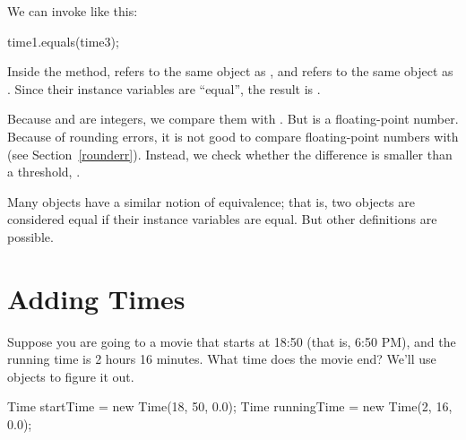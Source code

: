 We can invoke  like this:

\begin{code}
time1.equals(time3);
\end{code}

Inside the  method,  refers to the same object as , and  refers to the same object as .
Since their instance variables are ``equal'', the result is .

Because  and  are integers, we compare them with \java{==}.
But  is a floating-point number.
Because of rounding errors, it is not good to compare floating-point numbers with \java{==} (see Section~\ref{rounderr}).
Instead, we check whether the difference is smaller than a threshold, .

Many objects have a similar notion of equivalence; that is, two objects are considered equal if their instance variables are equal.
But other definitions are possible.



%
%


\section{Adding Times}
\label{addingtime}

Suppose you are going to a movie that starts at 18:50 (that is, 6:50 PM), and the running time is 2 hours 16 minutes.
What time does the movie end?
We'll use  objects to figure it out.

\begin{code}
Time startTime = new Time(18, 50, 0.0);
Time runningTime = new Time(2, 16, 0.0);
\end{code}


